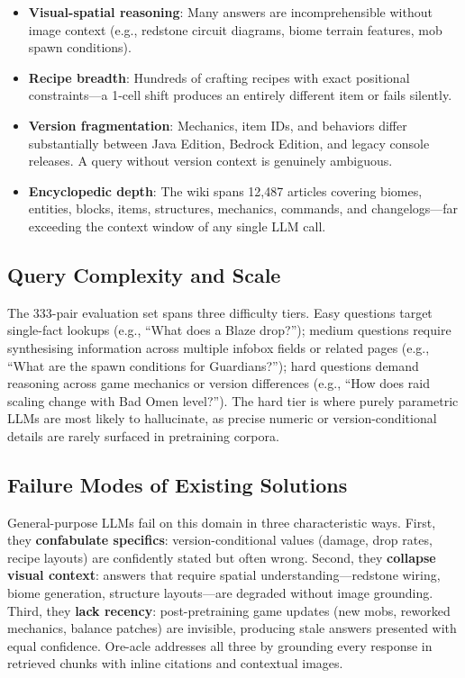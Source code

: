\documentclass[11pt,a4paper]{article}
\begin{document}
\begin{itemize}
    \item \textbf{Visual-spatial reasoning}: Many answers are incomprehensible without image context (e.g., redstone circuit diagrams, biome terrain features, mob spawn conditions).
    \item \textbf{Recipe breadth}: Hundreds of crafting recipes with exact positional constraints---a 1-cell shift produces an entirely different item or fails silently.
    \item \textbf{Version fragmentation}: Mechanics, item IDs, and behaviors differ substantially between Java Edition, Bedrock Edition, and legacy console releases. A query without version context is genuinely ambiguous.
    \item \textbf{Encyclopedic depth}: The wiki spans 12,487 articles covering biomes, entities, blocks, items, structures, mechanics, commands, and changelogs---far exceeding the context window of any single LLM call.
\end{itemize}

\subsection{Query Complexity and Scale}

The 333-pair evaluation set spans three difficulty tiers. Easy questions target single-fact lookups (e.g., ``What does a Blaze drop?''); medium questions require synthesising information across multiple infobox fields or related pages (e.g., ``What are the spawn conditions for Guardians?''); hard questions demand reasoning across game mechanics or version differences (e.g., ``How does raid scaling change with Bad Omen level?''). The hard tier is where purely parametric LLMs are most likely to hallucinate, as precise numeric or version-conditional details are rarely surfaced in pretraining corpora.

\subsection{Failure Modes of Existing Solutions}

General-purpose LLMs fail on this domain in three characteristic ways. First, they \textbf{confabulate specifics}: version-conditional values (damage, drop rates, recipe layouts) are confidently stated but often wrong. Second, they \textbf{collapse visual context}: answers that require spatial understanding---redstone wiring, biome generation, structure layouts---are degraded without image grounding. Third, they \textbf{lack recency}: post-pretraining game updates (new mobs, reworked mechanics, balance patches) are invisible, producing stale answers presented with equal confidence. Ore-acle addresses all three by grounding every response in retrieved chunks with inline citations and contextual images.
\end{document}
